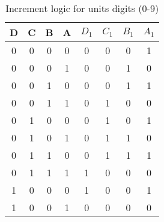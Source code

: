 \begin{table}[ht]
\centering
\caption{Increment logic for units digits (0-9)}
\begin{tabular}{|c|c|c|c|c|c|c|c|}
\hline
D & C & B & A & $D_1$ & $C_1$ & $B_1$ & $A_1$ \\ 
\hline
0 & 0 & 0 & 0 & 0 & 0 & 0 & 1 \\
0 & 0 & 0 & 1 & 0 & 0 & 1 & 0 \\
0 & 0 & 1 & 0 & 0 & 0 & 1 & 1 \\
0 & 0 & 1 & 1 & 0 & 1 & 0 & 0 \\
0 & 1 & 0 & 0 & 0 & 1 & 0 & 1 \\
0 & 1 & 0 & 1 & 0 & 1 & 1 & 0 \\
0 & 1 & 1 & 0 & 0 & 1 & 1 & 1 \\
0 & 1 & 1 & 1 & 1 & 0 & 0 & 0 \\
1 & 0 & 0 & 0 & 1 & 0 & 0 & 1 \\
1 & 0 & 0 & 1 & 0 & 0 & 0 & 0 \\
\hline
\end{tabular}
\end{table}
